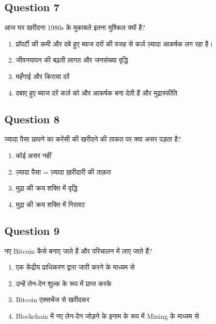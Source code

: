\documentclass[12pt,a4paper]{article}
\begin{document}
\bigskip


\subsection*{Question 7}
आज घर खरीदना 1980s के मुकाबले इतना मुश्किल क्यों है?

\begin{enumerate}[label=\Alph*., leftmargin=*]
\item प्रॉपर्टी की कमी और दबे हुए ब्याज दरों की वजह से कर्ज़ ज़्यादा आकर्षक लग रहा है।
\item जीवनयापन की बढ़ती लागत और जनसंख्या वृद्धि
\item महँगाई और किराया दरें
\item दबाए हुए ब्याज दरें कर्ज़ को और आकर्षक बना देती हैं और मुद्रास्फीति
\end{enumerate}

\bigskip


\subsection*{Question 8}
ज्यादा पैसा छापने का करेंसी की खरीदने की ताकत पर क्या असर पड़ता है?

\begin{enumerate}[label=\Alph*., leftmargin=*]
\item कोई असर नहीं
\item ज़्यादा पैसा = ज़्यादा ख़रीदारी की ताक़त
\item मुद्रा की क्रय शक्ति में वृद्धि
\item मुद्रा की क्रय शक्ति में गिरावट
\end{enumerate}

\bigskip


\subsection*{Question 9}
नए Bitcoin कैसे बनाए जाते हैं और परिचालन में लाए जाते हैं?

\begin{enumerate}[label=\Alph*., leftmargin=*]
\item एक केंद्रीय प्राधिकरण द्वारा जारी करने के माध्यम से
\item उन्हें लेन-देन शुल्क के रूप में प्राप्त करके
\item Bitcoin एक्सचेंज से खरीदकर
\item Blockchain में नए लेन-देन जोड़ने के इनाम के रूप में Mining के माध्यम से
\end{enumerate}
\end{document}
